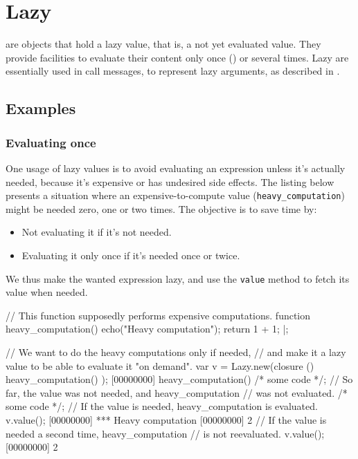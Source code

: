 
\section{Lazy}

 are objects that hold a lazy value, that is, a not yet
evaluated value. They provide facilities to evaluate their content only once
() or several times. Lazy are essentially used in call
messages, to represent lazy arguments, as described in
.

\subsection{Examples}

\subsubsection{Evaluating once}

One usage of lazy values is to avoid evaluating an expression unless it's
actually needed, because it's expensive or has undesired side effects. The
listing below presents a situation where an expensive-to-compute value
(\lstinline|heavy_computation|) might be needed zero, one or two times. The
objective is to save time by:

\begin{itemize}
\item Not evaluating it if it's not needed.
\item Evaluating it only once if it's needed once or twice.
\end{itemize}

We thus make the wanted expression lazy, and use the \lstinline|value|
method to fetch its value when needed.

\begin{urbiscript}[firstnumber=1]
// This function supposedly performs expensive computations.
function heavy_computation()
{
  echo("Heavy computation");
  return 1 + 1;
}|;

// We want to do the heavy computations only if needed,
// and make it a lazy value to be able to evaluate it "on demand".
var v = Lazy.new(closure () { heavy_computation() });
[00000000] heavy_computation()
/* some code */;
// So far, the value was not needed, and heavy_computation
// was not evaluated.
/* some code */;
// If the value is needed, heavy_computation is evaluated.
v.value();
[00000000] *** Heavy computation
[00000000] 2
// If the value is needed a second time, heavy_computation
// is not reevaluated.
v.value();
[00000000] 2
\end{urbiscript}

